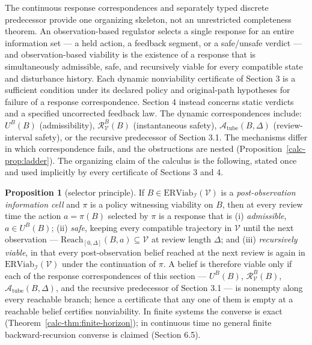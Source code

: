 \documentclass[10pt,twocolumn]{article}
\theoremstyle{definition}
\newtheorem{proposition}{Proposition}
\begin{document}
The continuous response correspondences and separately typed discrete predecessor provide one organizing skeleton, not an unrestricted completeness theorem. An
observation-based regulator selects a single response for an entire
information set --- a held action, a feedback segment, or a
safe/unsafe verdict --- and observation-based viability is the existence
of a response that is simultaneously admissible, safe, and recursively
viable for every compatible state and disturbance history. Each dynamic nonviability certificate of Section 3 is a sufficient condition under its declared policy and original-path hypotheses for failure of a response correspondence. Section 4 instead concerns static verdicts and a specified uncorrected feedback law. The dynamic correspondences include:
\(U^B(B)\) (admissibility), \(\mathcal{R}_{\mathcal{V}}^B(B)\)
(instantaneous safety), \(\mathcal{A}_{\mathrm{tube}}(B,\Delta)\)
(review-interval safety), or the recursive predecessor of Section 3.1.
The mechanisms differ in which correspondence fails, and the
obstructions are nested (Proposition~\ref{calc-prop:ladder}). The organizing
claim of the calculus is the following, stated once and used implicitly
by every certificate of Sections 3 and 4.

\begin{proposition}[selector principle]\label{calc-prop:selector}
If \(B\in\mathrm{ERViab}_{\mathcal{I}}(\mathcal{V})\) is a \emph{post-observation information cell} and \(\pi\) is a
policy witnessing viability on \(B\), then at every review time the
action \(a=\pi(B)\) selected by \(\pi\) is a response that is
(i) \emph{admissible}, \(a\in U^B(B)\); (ii) \emph{safe}, keeping every
compatible trajectory in \(\mathcal{V}\) until the next observation ---
\(\mathrm{Reach}_{[0,\Delta]}(B,a)\subseteq\mathcal{V}\) at review
length \(\Delta\); and (iii) \emph{recursively viable}, in that every
post-observation belief reached at the next review is again in
\(\mathrm{ERViab}_{\mathcal{I}}(\mathcal{V})\) under the continuation
of \(\pi\). A belief is therefore viable only if each of the response
correspondences of this section --- \(U^B(B)\),
\(\mathcal{R}_{\mathcal{V}}^B(B)\), \(\mathcal{A}_{\mathrm{tube}}(B,\Delta)\),
and the recursive predecessor of Section 3.1 --- is nonempty along
every reachable branch; hence a certificate that any one of them is
empty at a reachable belief certifies nonviability. In finite systems
the converse is exact (Theorem~\ref{calc-thm:finite-horizon}); in continuous time no general finite backward-recursion converse is
claimed (Section 6.5).
\end{proposition}
\end{document}
